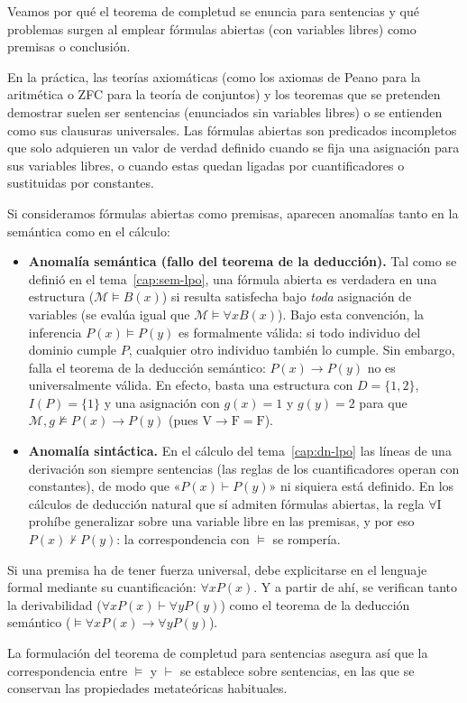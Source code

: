 \begin{observacion}\label{obs_formulas_abiertas}
Veamos por qué el teorema de completud se enuncia para
sentencias y qué problemas surgen al emplear
fórmulas abiertas (con variables libres) como premisas o conclusión. 

En la práctica, las teorías axiomáticas (como los axiomas de Peano
para la aritmética o ZFC para la teoría de conjuntos) y los teoremas
que se pretenden demostrar suelen ser sentencias
(enunciados sin variables libres) o se entienden como sus clausuras universales. Las fórmulas abiertas son
predicados incompletos que solo adquieren un valor de verdad definido
cuando se fija una asignación para sus variables libres, o cuando estas quedan ligadas por cuantificadores o sustituidas
por constantes. 

Si consideramos fórmulas abiertas como premisas, aparecen 
anomalías tanto en la semántica como en el cálculo: 
\begin{itemize}
    \item \textbf{Anomalía semántica (fallo del teorema de la
        deducción).} Tal como se definió en el tema~\ref{cap:sem-lpo}, una fórmula
      abierta es verdadera en una estructura ($\mathcal{M} \models B(x)$)
      si resulta satisfecha bajo \emph{toda} asignación de variables
      (se evalúa igual que $\mathcal{M} \models \forall x B(x)$). Bajo
      esta convención, la inferencia $P(x) \models P(y)$ es
      formalmente válida: si todo individuo del dominio cumple $P$,
      cualquier otro individuo también lo cumple. Sin embargo,
      falla el teorema de la deducción semántico: $P(x) \to P(y)$
      no es universalmente válida. En efecto,
      basta una estructura con $D = \{1, 2\}$, $I(P) = \{1\}$ y una
      asignación con $g(x) = 1$ y $g(y) = 2$ para que
      $\mathcal{M}, g \not\models P(x) \to P(y)$ (pues $\text{V} \to \text{F} = \text{F}$). 
    \item \textbf{Anomalía sintáctica.}
      En el cálculo del tema~\ref{cap:dn-lpo} las líneas de una derivación son siempre
      sentencias (las reglas de los cuantificadores operan con
      constantes), de modo que «$P(x) \vdash P(y)$» ni siquiera está
      definido. En los cálculos de deducción natural que sí admiten fórmulas abiertas, la
      regla $\forall\text{I}$ prohíbe generalizar sobre una variable
      libre en las premisas, y por eso $P(x) \nvdash P(y)$: la
      correspondencia con $\models$ se rompería. 
\end{itemize}
Si una premisa ha de tener fuerza universal,
debe explicitarse en el lenguaje formal mediante su cuantificación:
$\forall x P(x)$. Y a partir de ahí, se verifican tanto la
derivabilidad ($\forall x P(x) \vdash \forall y P(y)$) como el teorema
de la deducción semántico ($\models \forall x P(x) \to \forall y P(y)$). 

La formulación del teorema de completud para sentencias asegura así
que la correspondencia entre $\models$ y $\vdash$ se establece sobre
sentencias, en las que se conservan las propiedades metateóricas
habituales. 
\end{observacion}

